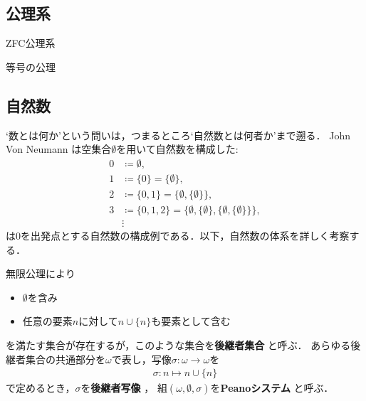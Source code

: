 \subsection{公理系}
	\begin{screen}
		ZFC公理系
	\end{screen}
	
	\begin{screen}
		等号の公理
	\end{screen}
	
\subsection{自然数}
	`数とは何か'という問いは，つまるところ`自然数とは何者か'まで遡る．
	John Von Neumann は空集合$\emptyset$を用いて自然数を構成した:
	\begin{align}
		0 &\coloneqq \emptyset, \\
		1 &\coloneqq \{0\} = \{\emptyset\}, \\
		2 &\coloneqq \{0,1\} = \{\emptyset,\{\emptyset\}\}, \\
		3 &\coloneqq \{0,1,2\} = \{\emptyset,\{\emptyset\},\{\emptyset,\{\emptyset\}\}\}, \\
		&\vdots
	\end{align}
	は$0$を出発点とする自然数の構成例である．以下，自然数の体系を詳しく考察する．
	
	\begin{screen}
		\begin{dfn}[Peanoシステム]
			無限公理により
			\begin{itemize}
				\item $\emptyset$を含み
				\item 任意の要素$n$に対して$n \cup \{n\}$も要素として含む
			\end{itemize}
			を満たす集合が存在するが，このような集合を{\bf 後継者集合}
			と呼ぶ．
			あらゆる後継者集合の共通部分を$\omega$で表し，写像$\sigma:\omega \longrightarrow
			\omega$を
			\begin{align}
				\sigma:n \longmapsto n \cup \{n\}
			\end{align}
			で定めるとき，$\sigma$を{\bf 後継者写像}
			，
			組$(\omega,\emptyset,\sigma)$を{\bf Peanoシステム}
			と呼ぶ．
		\end{dfn}
	\end{screen}
	
